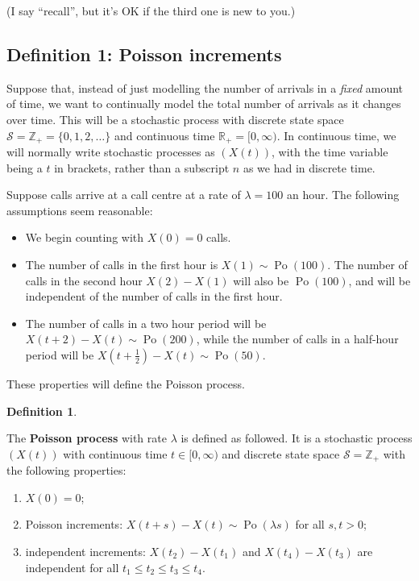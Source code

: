 \documentclass[
  a4paper,
]{article}
\providecommand{\tightlist}{%
  \setlength{\itemsep}{0pt}\setlength{\parskip}{0pt}}
\theoremstyle{definition}
\newtheorem{definition}{Definition}[section]
\theoremstyle{definition}
\theoremstyle{definition}
\theoremstyle{remark}
\begin{document}
(I say ``recall'', but it's OK if the third one is new to you.)

\hypertarget{poisson-def-poisson}{%
\subsection{Definition 1: Poisson increments}\label{poisson-def-poisson}}

Suppose that, instead of just modelling the number of arrivals in a \emph{fixed} amount of time, we want to continually model the total number of arrivals as it changes over time. This will be a stochastic process with discrete state space \(\mathcal S = \mathbb Z_+ = \{0,1,2,\dots\}\) and continuous time \(\mathbb R_+ = [0,\infty)\). In continuous time, we will normally write stochastic processes as \((X(t))\), with the time variable being a \(t\) in brackets, rather than a subscript \(n\) as we had in discrete time.

Suppose calls arrive at a call centre at a rate of \(\lambda = 100\) an hour. The following assumptions seem reasonable:

\begin{itemize}
\tightlist
\item
  We begin counting with \(X(0) = 0\) calls.
\item
  The number of calls in the first hour is \(X(1) \sim \operatorname{Po}(100)\). The number of calls in the second hour \(X(2) - X(1)\) will also be \(\operatorname{Po}(100)\), and will be independent of the number of calls in the first hour.
\item
  The number of calls in a two hour period will be \(X(t+2) - X(t) \sim \operatorname{Po}(200)\), while the number of calls in a half-hour period will be \(X(t+\frac12) - X(t) \sim \operatorname{Po}(50)\).
\end{itemize}

These properties will define the Poisson process.

\begin{definition}
\protect\hypertarget{def:poisson-def-1}{}\label{def:poisson-def-1}

The \textbf{Poisson process} with rate \(\lambda\) is defined as followed. It is a stochastic process \((X(t))\) with continuous time \(t \in [0,\infty)\) and discrete state space \(\mathcal S = \mathbb Z_+\) with the following properties:

\begin{enumerate}
\def\labelenumi{\arabic{enumi}.}
\tightlist
\item
  \(X(0) = 0\);
\item
  Poisson increments: \(X(t+s) - X(t) \sim \operatorname{Po}(\lambda s)\) for all \(s,t>0\);
\item
  independent increments: \(X(t_2) - X(t_1)\) and \(X(t_4) - X(t_3)\) are independent for all \(t_1 \leq t_2 \leq t_3 \leq t_4\).
\end{enumerate}

\end{definition}
\end{document}
